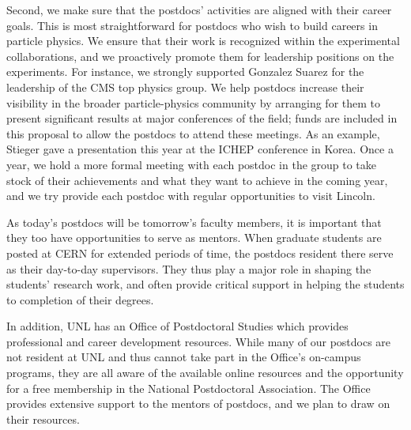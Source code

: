 \documentclass[11pt]{article}
\begin{document}
Second, we make sure that the postdocs' activities are aligned with their
career goals.  This is most straightforward for postdocs who wish to build
careers in particle physics.  We ensure that their work is recognized
within the experimental collaborations, and we proactively promote them for
leadership positions on the experiments.  For instance, we strongly
supported Gonzalez Suarez for the leadership of the CMS top physics group.
We help postdocs increase their visibility in the broader particle-physics
community by arranging for them to present significant results at major
conferences of the field; funds are included in this proposal to allow the
postdocs to attend these meetings.  As an example, Stieger gave a
presentation this year at the ICHEP conference in Korea.  Once a year,
we hold a more formal meeting with each postdoc in the group to take stock
of their achievements and what they want to achieve in the coming year, and
we try provide each postdoc with regular opportunities to visit Lincoln.

As today's postdocs will be tomorrow's faculty members, it is important
that they too have opportunities to serve as mentors. When graduate
students are posted at CERN  for extended periods of time, the
postdocs resident there serve as their day-to-day supervisors. They
thus play a major role in shaping the students' research work, and often
provide critical support in helping the students to completion of their degrees.

In addition, UNL has an Office of Postdoctoral Studies which provides
professional and career development resources.  While many of our postdocs are
not resident at UNL and thus cannot take part in the Office's
on-campus programs, they are all aware of the available online resources
and the opportunity for a free membership in the National Postdoctoral
Association.  The Office provides extensive support to the mentors of
postdocs, and we plan to draw on their resources.
\end{document}
